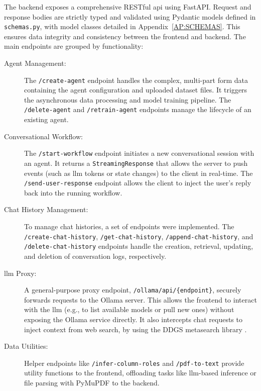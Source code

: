 The backend exposes a comprehensive RESTful \acs{api} using FastAPI. Request and response bodies are strictly typed and validated using Pydantic models defined in \texttt{schemas.py}, with model classes detailed in Appendix~\ref{AP:SCHEMAS}. This ensures data integrity and consistency between the frontend and backend. The main endpoints are grouped by functionality:

\begin{description}
    \item[Agent Management:] The \texttt{/create-agent} endpoint handles the complex, multi-part form data containing the agent configuration and uploaded dataset files. It triggers the asynchronous data processing and model training pipeline. The \texttt{/delete-agent} and \texttt{/retrain-agent} endpoints manage the lifecycle of an existing agent.

    \item[Conversational Workflow:] The \texttt{/start-workflow} endpoint initiates a new conversational session with an agent. It returns a \texttt{StreamingResponse} that allows the server to push events (such as \ac{llm} tokens or state changes) to the client in real-time. The \texttt{/send-user-response} endpoint allows the client to inject the user's reply back into the running workflow.

    \item[Chat History Management:] To manage chat histories, a set of endpoints were implemented. The \texttt{/create-chat-history}, \texttt{/get-chat-history}, \texttt{/append-chat-history}, and \\ \texttt{/delete-chat-history} endpoints handle the creation, retrieval, updating, and deletion of conversation logs, respectively.

    \item[\acs{llm} Proxy:] A general-purpose proxy endpoint, \texttt{/ollama/api/\{endpoint\}}, securely forwards requests to the Ollama server. This allows the frontend to interact with the \ac{llm} (e.g., to list available models or pull new ones) without exposing the Ollama service directly. It also intercepts chat requests to inject context from web search, by using the DDGS metasearch library \cite{DDGS-SEARCH}.

    \item[Data Utilities:] Helper endpoints like \texttt{/infer-column-roles} and \texttt{/pdf-to-text} provide utility functions to the frontend, offloading tasks like \ac{llm}-based inference or file parsing with PyMuPDF \cite{PYMUPDF} to the backend.
\end{description}
